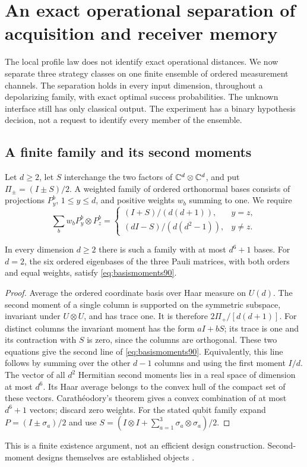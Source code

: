 \section{An exact operational separation of acquisition and receiver memory}
\label{sec:operationalmemory90}
The local profile law does not identify exact operational distances.
We now separate three strategy classes on one finite ensemble of ordered
measurement channels.  The separation holds in every input dimension,
throughout a depolarizing family, with exact optimal success probabilities.
The unknown interface still has only classical output.  The experiment
has a binary hypothesis decision, not a request to identify every member
of the ensemble.

\subsection{A finite family and its second moments}
Let $d\ge2$, let $S$ interchange the two factors of $\mathbb C^d\otimes\mathbb C^d$,
and put $\Pi_\pm=(I\pm S)/2$.  A weighted family of ordered orthonormal
bases consists of projections $P_y^b$, $1\le y\le d$, and positive
weights $w_b$ summing to one.  We require
\begin{equation}\label{eq:basismoments90}
 \sum_b w_b P_y^b\otimes P_z^b=
 \begin{cases}
 (I+S)/(d(d+1)),&y=z,\\
 (dI-S)/(d(d^2-1)),&y\ne z.
 \end{cases}
\end{equation}
\begin{lemma}\label{lem:finitedesign90}
In every dimension $d\ge2$ there is such a family with at most $d^6+1$
bases.  For $d=2$, the six ordered eigenbases of the three Pauli matrices,
with both orders and equal weights, satisfy \eqref{eq:basismoments90}.
\end{lemma}
\begin{proof}
Average the ordered coordinate basis over Haar measure on $U(d)$.
The second moment of a single column is supported on the symmetric
subspace, invariant under $U\otimes U$, and has trace one.  It is
therefore $2\Pi_+/[d(d+1)]$.  For distinct columns the invariant moment
has the form $aI+bS$; its trace is one and its contraction with $S$ is
zero, since the columns are orthogonal.  These two equations give the
second line of \eqref{eq:basismoments90}.  Equivalently, this line follows
by summing over the other $d-1$ columns and using the first moment $I/d$.
The vector of all $d^2$ Hermitian second moments lies in a real space of
dimension at most $d^6$.  Its Haar average belongs to the convex hull
of the compact set of these vectors.  Carath\'eodory's theorem gives a
convex combination of at most $d^6+1$ vectors; discard zero weights.
For the stated qubit family expand $P=(I\pm\sigma_a)/2$ and use
$S=(I\otimes I+\sum_{a=1}^3\sigma_a\otimes\sigma_a)/2$.
\end{proof}
This is a finite existence argument, not an efficient design construction.
Second-moment designs themselves are established objects \cite{GAE90}.

